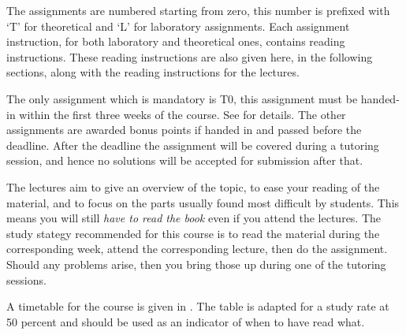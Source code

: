 \documentclass[a4paper,logo]{miunart}
\begin{document}

The assignments are numbered starting from zero, this number is prefixed with 
`T' for theoretical and `L' for laboratory assignments.
Each assignment instruction, for both laboratory and theoretical ones, contains 
reading instructions.
These reading instructions are also given here, in the following sections, 
along with the reading instructions for the lectures.

The only assignment which is mandatory is T0, this assignment must be handed-in 
within the first three weeks of the course.
See  for details.
The other assignments are awarded bonus points if handed in and passed before 
the deadline.
After the deadline the assignment will be covered during a tutoring session, 
and hence no solutions will be accepted for submission after that.

The lectures aim to give an overview of the topic, to ease your reading of the 
material, and to focus on the parts usually found most difficult by students.
This means you will still \emph{have to read the book} even if you attend the 
lectures.
The study stategy recommended for this course is to read the material during 
the corresponding week, attend the corresponding lecture, then do the 
assignment.
Should any problems arise, then you bring those up during one of the tutoring 
sessions.

A timetable for the course is given in .
The table is adapted for a study rate at 50 percent and should be used as an 
indicator of when to have read what.
\end{document}
